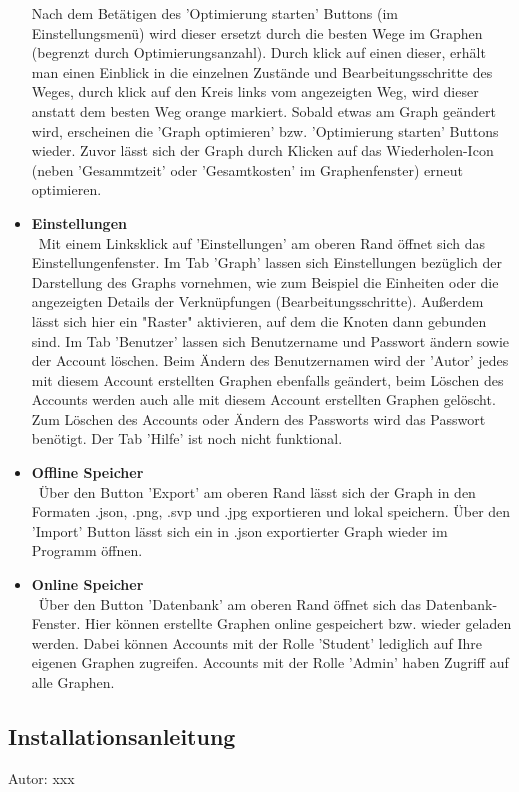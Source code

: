 \documentclass[twoside]{report}
\begin{document}
\begin{itemize}
Nach dem Betätigen des 'Optimierung starten' Buttons (im Einstellungsmenü) wird dieser ersetzt durch die besten Wege im Graphen (begrenzt durch Optimierungsanzahl). Durch klick auf einen dieser, erhält man einen Einblick in die einzelnen Zustände und Bearbeitungsschritte des Weges, durch klick auf den Kreis links vom angezeigten Weg, wird dieser anstatt dem besten Weg orange markiert.
Sobald etwas am Graph geändert wird, erscheinen die 'Graph optimieren' bzw. 'Optimierung starten' Buttons wieder. Zuvor lässt sich der Graph durch Klicken auf das Wiederholen-Icon (neben 'Gesammtzeit' oder 'Gesamtkosten' im Graphenfenster) erneut optimieren.
  \item \textbf{ Einstellungen }
    \\\
      Mit einem Linksklick auf 'Einstellungen' am oberen Rand öffnet sich das Einstellungenfenster. Im Tab 'Graph' lassen sich Einstellungen bezüglich der Darstellung des Graphs vornehmen, wie zum Beispiel die Einheiten oder die angezeigten Details der Verknüpfungen (Bearbeitungsschritte). Außerdem lässt sich hier ein "Raster" aktivieren, auf dem die Knoten dann gebunden sind. Im Tab 'Benutzer' lassen sich Benutzername und Passwort ändern sowie der Account löschen. Beim Ändern des Benutzernamen wird der 'Autor' jedes mit diesem Account erstellten Graphen ebenfalls geändert, beim Löschen des Accounts werden auch alle mit diesem Account erstellten Graphen gelöscht. Zum Löschen des Accounts oder Ändern des Passworts wird das Passwort benötigt. Der Tab 'Hilfe' ist noch nicht funktional.
  \item \textbf{ Offline Speicher }
    \\\
      Über den Button 'Export' am oberen Rand lässt sich der Graph in den Formaten .json, .png, .svp und .jpg exportieren und lokal speichern. Über den 'Import' Button lässt sich ein in .json exportierter Graph wieder im Programm öffnen.
  \item \textbf{ Online Speicher }
    \\\
      Über den Button 'Datenbank' am oberen Rand öffnet sich das Datenbank-Fenster. Hier können erstellte Graphen online gespeichert bzw. wieder geladen werden. Dabei können Accounts mit der Rolle 'Student' lediglich auf Ihre eigenen Graphen zugreifen. Accounts mit der Rolle 'Admin' haben Zugriff auf alle Graphen.
\end{itemize}


\subsection{Installationsanleitung}
{\small Autor: xxx}
\end{document}
